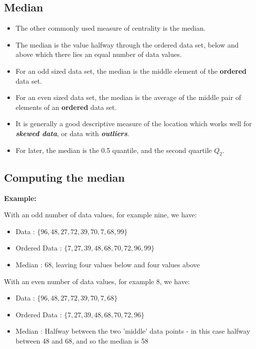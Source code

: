 {
\subsection{Median}
\begin{itemize}
\item The other commonly used measure of centrality is the median.

\item The median is the value halfway through the ordered data set, below and above which there lies an equal number of data values.
\item For an odd sized data set, the median is the middle element of the \textbf{ordered} data set.
\item For an even sized data set, the median is the average of the middle pair of elements of an \textbf{ordered} data set.
\item It is generally a good descriptive measure of the location which works well for \textbf{\emph{skewed data}}, or data with \textbf{\emph{outliers}}.

\item For later, the median is the 0.5 quantile, and the second quartile $Q_2$.
\end{itemize}
}

{
\subsection{Computing the median}
\textbf{Example:}


With an odd number of data values, for example nine, we have:
\begin{itemize}
\item Data : $\{96, 48, 27, 72, 39, 70, 7, 68, 99 \}$
\item Ordered Data :  $\{7, 27, 39, 48, 68, 70, 72, 96, 99\}$
\item Median : 68, leaving four values below and four values above
\end{itemize}
\bigskip
With an even number of data values, for example 8, we have:
\begin{itemize}
\item Data : $\{96, 48 ,27 ,72, 39, 70, 7, 68  \}$
\item Ordered Data : $\{7, 27, 39, 48, 68, 70, 72, 96\}$
\item Median : Halfway between the two 'middle' data points - in this case halfway between 48 and 68, and so the median is 58
\end{itemize}
} %
